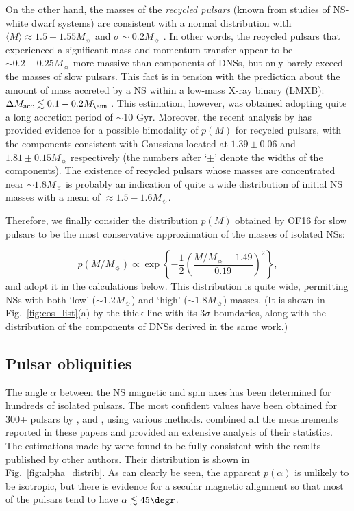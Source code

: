 \documentclass[fleqn,usenatbib]{mnras}
\begin{document}
On the other hand, the masses of the {\it recycled pulsars} (known
from studies of NS-white dwarf systems) are consistent with a
normal distribution with $\langle M \rangle \approx 1.5-1.55M_{\sun}$ and $\sigma\sim
0.2M_{\sun}$ \citep[][OF16]{kiz13}. In other words, the recycled pulsars
that experienced a significant mass and momentum transfer appear
to be $\sim 0.2-0.25M_{\sun}$ more massive than components of DNSs,
but only barely exceed the masses of slow pulsars. This fact is in
tension with the prediction about the amount of mass accreted by a
NS within a low-mass X-ray binary (LMXB): $\Delta
M_{\rm acc} \lesssim 0.1-0.2 M_{\sun}$ \citep[e.g.][]{kiz13}. This estimation, however, was obtained
adopting quite a long accretion period of $\sim$10 Gyr. Moreover, the
recent analysis by \cite{anto16} has provided evidence
for a possible bimodality of $p(M)$ for recycled pulsars, with the
components consistent with Gaussians located at $1.39\pm 0.06$ and $1.81\pm 0.15M_{\sun}$ respectively (the numbers after `$\pm$' denote the
widths of the components). The existence of recycled pulsars whose
masses are concentrated near $\sim 1.8M_{\sun}$ is probably an indication
of quite a wide distribution of initial NS masses with a mean of
$\approx 1.5-1.6M_{\sun}$.

Therefore, we finally consider the distribution $p(M)$ obtained by
OF16 for slow pulsars to be the most conservative approximation
of the masses of isolated NSs:

\begin{equation}
    p(M/M_{\sun}) \propto \exp\left\{ - \dfrac{1}{2}\left(\dfrac{M/M_{\sun} -
          1.49}{0.19}\right)^2 \right\} ,
    \label{eq:mass_distrib}
\end{equation}
and adopt it in the calculations below. This distribution is quite wide,
permitting NSs with both `low' ($\sim 1.2M_{\sun}$) and `high' ($\sim 1.8M_{\sun}$)
masses. (It is shown in Fig.~\ref{fig:eos_list}(a) by the thick line with its $3\sigma$
boundaries, along with the distribution of the components of DNSs
derived in the same work.)

\subsection{Pulsar obliquities}
\label{sect:psr_obliq}


The angle $\alpha$ between the NS magnetic and spin axes has been determined for hundreds of isolated pulsars. The most confident values
have been obtained for 300+ pulsars by \cite{lyne88}, \cite{rankin93a, rankin93b} and \cite{gould94}, using various methods. \cite{tm98} combined all the measurements reported in
these papers and provided an extensive analysis of their statistics.
The estimations made by \cite{rankin93a} were found to be fully
consistent with the results published by other authors. Their distribution is shown in Fig.~\ref{fig:alpha_distrib}. As can clearly be seen, the apparent $p(\alpha)$ is
unlikely to be isotropic, but there is evidence for a secular magnetic
alignment so that most of the pulsars tend to have $\alpha \lesssim 45\degr$.
\end{document}
